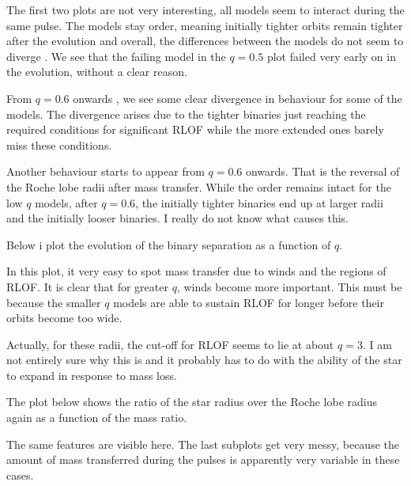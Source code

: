 \documentclass[a4paper,10pt]{article}
\begin{document}
The first two plots are not very interesting, all models seem to interact during the same pulse. The models stay order, meaning initially tighter orbits remain tighter after the evolution and overall, the differences between the models do not seem to diverge . We see that the failing model in the \(q= 0.5\) plot failed very early on in the evolution, without a clear reason.

From \(q=0.6\) onwards , we see some clear divergence in behaviour for some of the models.
The divergence arises due to the tighter binaries just reaching the required conditions for significant RLOF while the more extended ones barely miss these conditions.

Another behaviour starts to appear from \(q=0.6\) onwards. That is the reversal of the Roche lobe radii after mass transfer. While the order remains intact for the low \(q\) models, after \(q=0.6\), the initially tighter binaries end up at larger radii and the initially looser binaries. I really do not know what causes this.

Below i plot the evolution of the binary separation as a function of \(q\).
\begin{figure}[ht]
    \centering
\end{figure}

In this plot, it very easy to spot mass transfer due to winds and the regions of RLOF. It is clear that for greater \(q\), winds become more important. This must be because the smaller \(q\) models are able to sustain RLOF for longer before their orbits become too wide.

Actually, for these radii, the cut-off for RLOF seems to lie at about \(q=3\). I am not entirely sure why this is and it probably has to do with the ability of the star to expand in response to mass loss.

The plot below shows the ratio of the star radius over the Roche lobe radius again as a function of the mass ratio.

\begin{figure}[ht]
    \centering
\end{figure}

The same features are visible here. The last subplots get very messy, because the amount of mass transferred during the pulses is apparently very variable in these cases.
\end{document}
